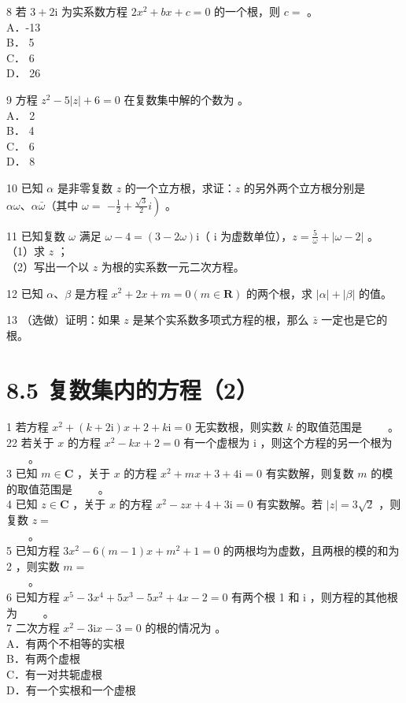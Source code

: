 \documentclass[10pt]{article}
\begin{document}
8 若 \(3+2 \mathrm{i}\) 为实系数方程 \(2 x^{2}+b x+c=0\) 的一个根，则 \(c=\) 。\\
A．-13\\
B． 5\\
C． 6\\
D． 26

9 方程 \(z^{2}-5|z|+6=0\) 在复数集中解的个数为 。\\
A． 2\\
B． 4\\
C． 6\\
D． 8

10 已知 \(\alpha\) 是非零复数 \(z\) 的一个立方根，求证：\(z\) 的另外两个立方根分别是 \(\alpha \omega 、 \alpha \bar{\omega}\)（其中 \(\omega=\) \(\left.-\frac{1}{2}+\frac{\sqrt{3}}{2} i\right)\) 。

11 已知复数 \(\omega\) 满足 \(\omega-4=(3-2 \omega) \mathrm{i}\)（ i 为虚数单位），\(z=\frac{5}{\omega}+|\omega-2|\) 。\\
（1）求 \(z\) ；\\
（2）写出一个以 \(z\) 为根的实系数一元二次方程。

12 已知 \(\alpha 、 \beta\) 是方程 \(x^{2}+2 x+m=0(m \in \mathbf{R})\) 的两个根，求 \(|\alpha|+|\beta|\) 的值。

13 （选做）证明：如果 \(z\) 是某个实系数多项式方程的根，那么 \(\bar{z}\) 一定也是它的根。

\section*{8.5 复数集内的方程（2）}
1 若方程 \(x^{2}+(k+2 \mathrm{i}) x+2+k \mathrm{i}=0\) 无实数根，则实数 \(k\) 的取值范围是 \(\qquad\)。\\
22 若关于 \(x\) 的方程 \(x^{2}-k x+2=0\) 有一个虚根为 i ，则这个方程的另一个根为 \(\qquad\)。\\
3 已知 \(m \in \mathbf{C}\) ，关于 \(x\) 的方程 \(x^{2}+m x+3+4 \mathrm{i}=0\) 有实数解，则复数 \(m\) 的模的取值范围是 \(\qquad\)。\\
4 已知 \(z \in \mathbf{C}\) ，关于 \(x\) 的方程 \(x^{2}-z x+4+3 \mathrm{i}=0\) 有实数解。若 \(|z|=3 \sqrt{2}\) ，则复数 \(z=\)\\
\(\qquad\)。\\
5 已知方程 \(3 x^{2}-6(m-1) x+m^{2}+1=0\) 的两根均为虚数，且两根的模的和为 2 ，则实数 \(m=\)\\
\(\qquad\)。\\
6 已知方程 \(x^{5}-3 x^{4}+5 x^{3}-5 x^{2}+4 x-2=0\) 有两个根 1 和 i ，则方程的其他根为 \(\qquad\)。\\
7 二次方程 \(x^{2}-3 \mathrm{i} x-3=0\) 的根的情况为 。\\
A．有两个不相等的实根\\
B．有两个虚根\\
C．有一对共轭虚根\\
D．有一个实根和一个虚根
\end{document}
